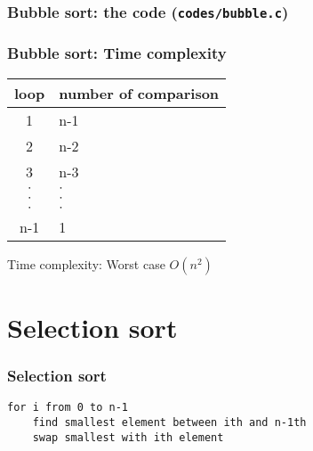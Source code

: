 \documentclass[newPxFont,sthlmFooter,nooffset]{beamer}
\begin{document}
\begin{frame}
  \frametitle{Bubble sort: the code (\texttt{codes/bubble.c})}
  

\end{frame}

\begin{frame}[t]
  \frametitle{Bubble sort: Time complexity}

\begin{center}
  \begin{tabular}{c p{3cm}}
    loop & number of comparison \\ \hline
    1    & n-1 \\
    2    & n-2 \\
    3    & n-3 \\
 $\cdot$ &  $\cdot$ \\
 $\cdot$ &  $\cdot$ \\
 $\cdot$ &  $\cdot$ \\
    n-1  &  1 \\
  \end{tabular}
\end{center}
Time complexity: Worst case $O(n^2)$
\end{frame}


\section{Selection sort}

\begin{frame}[t, fragile]
  \frametitle{Selection sort}

  \begin{lstlisting}
for i from 0 to n-1
    find smallest element between ith and n-1th
    swap smallest with ith element
  \end{lstlisting}  
\end{frame}
\end{document}
